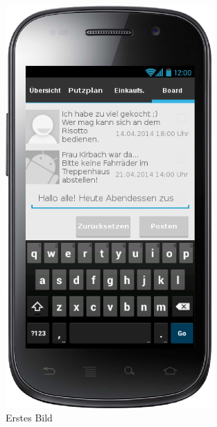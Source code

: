 \begin{figure}[htbp] 
  \centering
     \includegraphics[width=0.7\textwidth]{anhang/mockups/blackboardneuenotiz.png}
  \caption{Erstes Bild}
  \label{fig:Bild1}
\end{figure}


